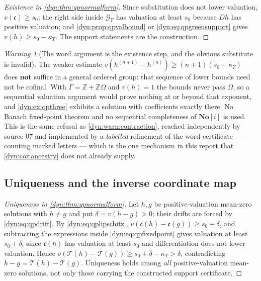 \documentclass[11pt,letterpaper]{article}
\theoremstyle{definition}
\theoremstyle{remark}
\newtheorem{warning}[warning]{Warning}
\newcommand{\Z}{\mathbb Z}
\newcommand{\No}{\mathbf{No}}
\newcommand{\Gups}{\mathcal G_{\Upsilon}}
\newcommand{\kups}{\kappa_{\Upsilon}}
\numberwithin{equation}{section}
\begin{document}
\begin{proof}[Existence in \cref{dyn:thm:qpnormalform}]
Since substitution does not lower valuation, $v(\mathfrak c)\ge s_0$; the
right side inside $\Gups$ has valuation at least $s_0$ because $Dh$ has
positive valuation; and \cref{dyn:prop:qpvalbound} or
\eqref{dyn:eq:qpgreensupport} gives $v(h)\ge s_0-\kups$. The support
statements are the construction.
\end{proof}

\begin{warning}[The word argument is the existence step, and the obvious
substitute is invalid]\label{dyn:warn:qpcontraction}
The weaker estimate
$v(h^{(n+1)}-h^{(n)})\ge(n+1)(s_0-\kups)$ does \textbf{not} suffice in a
general ordered group: that sequence of lower bounds need not be cofinal.
With $\Gamma=\Z+\Z\Omega$ and $v(h)=1$ the bounds never pass $\Omega$, so a
sequential valuation argument would prove nothing at or beyond that
exponent, and \cref{dyn:ex:qpthree} exhibits a solution with coefficients
exactly there. No Banach fixed-point theorem and no sequential
completeness of $\No[i]$ is used. This is the same refusal as
\cref{dyn:warn:contraction}, reached independently by source 07 and
implemented by a \emph{labelled} refinement of the word certificate ---
counting marked letters --- which is the one mechanism in this report that
\cref{dyn:cor:ancestry} does not already supply.
\end{warning}

\subsection{Uniqueness and the inverse coordinate map}

\begin{proof}[Uniqueness in \cref{dyn:thm:qpnormalform}]
Let $h,g$ be positive-valuation mean-zero solutions with $h\ne g$ and put
$\delta=v(h-g)>0$; their drifts are forced by \eqref{dyn:eq:qpdrift}. By
\eqref{dyn:eq:qplipschitz},
$v(\mathfrak c(h)-\mathfrak c(g))\ge s_0+\delta$, and subtracting the
expressions inside \eqref{dyn:eq:qpfixedpoint} gives valuation at least
$s_0+\delta$, since $\mathfrak c(h)$ has valuation at least $s_0$ and
differentiation does not lower valuation. Hence
$v(\mathcal T(h)-\mathcal T(g))\ge s_0+\delta-\kups>\delta$, contradicting
$h-g=\mathcal T(h)-\mathcal T(g)$. Uniqueness holds among \emph{all}
positive-valuation mean-zero solutions, not only those carrying the
constructed support certificate.
\end{proof}
\end{document}
